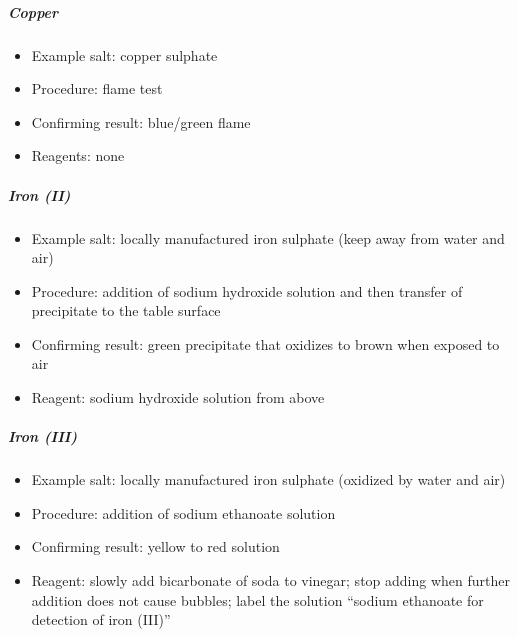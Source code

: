 \subparagraph{Copper}
\begin{itemize}
\item{Example salt: copper sulphate}
\item{Procedure: flame test}
\item{Confirming result: blue/green flame}
\item{Reagents: none}
\end{itemize}

\subparagraph{Iron (II)}
\begin{itemize}
\item{Example salt: locally manufactured iron sulphate 
(keep away from water and air)}
\item{Procedure: addition of sodium hydroxide solution 
and then transfer of precipitate to the table surface}
\item{Confirming result: green precipitate 
that oxidizes to brown when exposed to air}
\item{Reagent: sodium hydroxide solution from above}
\end{itemize}

\subparagraph{Iron (III)}
\begin{itemize}
\item{Example salt: locally manufactured iron sulphate 
(oxidized by water and air)}
\item{Procedure: addition of sodium ethanoate solution}
\item{Confirming result: yellow to red solution}
\item{Reagent: slowly add bicarbonate of soda to vinegar; stop adding when further addition does not cause bubbles; label the solution ``sodium ethanoate for detection of iron (III)''}
\end{itemize}

